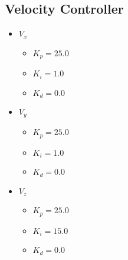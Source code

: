 \documentclass[10pt, a4paper]{article}
\begin{document}
\begin{multicols}{2}
    \subsection{Velocity Controller}
        \begin{itemize}
            \item $V_x$
            \begin{itemize}
                \item $K_p = 25.0$
                \item $K_i = 1.0$
                \item $K_d = 0.0$
            \end{itemize}
            \item $V_y$
            \begin{itemize}
                \item $K_p = 25.0$
                \item $K_i = 1.0$
                \item $K_d = 0.0$
            \end{itemize}
            \item $V_z$
            \begin{itemize}
                \item $K_p = 25.0$
                \item $K_i = 15.0$
                \item $K_d = 0.0$
            \end{itemize}
        \end{itemize}
    \end{multicols}
    \\ \\
\end{document}
